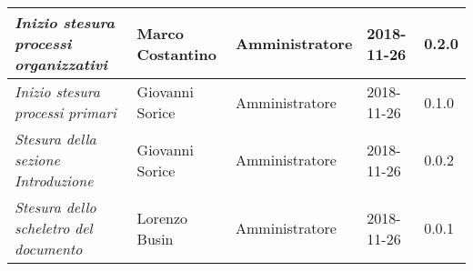 \begin{table}[H]
\begin{tabular}{p{4cm}|C{3cm}|C{3cm}|R{2.5cm}|R{2cm}}
		\emph{Inizio stesura processi organizzativi} & Marco Costantino & Amministratore & 2018-11-26 & 0.2.0 \\
		\hline
		
		\emph{Inizio stesura processi primari} & Giovanni Sorice & Amministratore & 2018-11-26 & 0.1.0 \\
		\hline
		
		\emph{Stesura della sezione Introduzione} & Giovanni Sorice & Amministratore & 2018-11-26 & 0.0.2 \\
		\hline
		
		\emph{Stesura dello scheletro del documento} & Lorenzo Busin & Amministratore & 2018-11-26 & 0.0.1 \\
		
	\end{tabular}
	
\end{table}


\clearpage